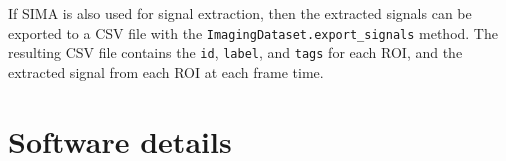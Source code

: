 If SIMA is also used for signal extraction, then the extracted signals can be
exported to a CSV file with the \verb|ImagingDataset.export_signals| method.
The resulting CSV file contains the \verb|id|, \verb|label|, and \verb|tags| for each
ROI, and the extracted signal from each ROI at each frame time.


\section{Software details}\label{sec:sima:details}





